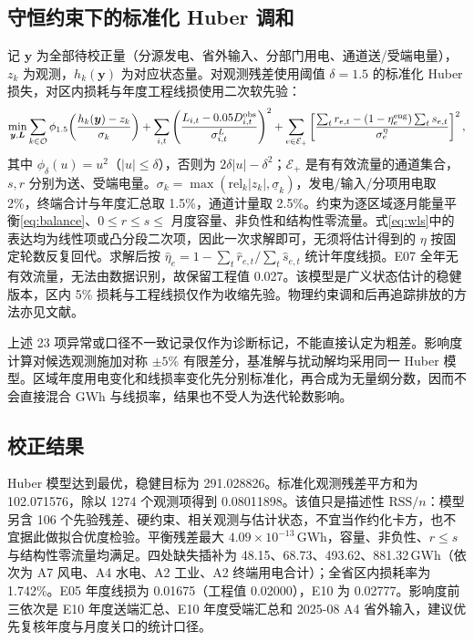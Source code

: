 \documentclass[UTF8,a4paper,zihao=-4,fontset=fandol]{ctexart}
\begin{document}
\subsection{守恒约束下的标准化 Huber 调和}

记 $\boldsymbol y$ 为全部待校正量（分源发电、省外输入、分部门用电、通道送/受端电量），$z_k$ 为观测，$h_k(\boldsymbol y)$ 为对应状态量。对观测残差使用阈值 $\delta=1.5$ 的标准化 Huber 损失，对区内损耗与年度工程线损使用二次软先验\cite{Crowe1996data,Narasimhan1999data}：
\begin{equation}
\min_{\boldsymbol y,\boldsymbol L}
\sum_{k\in\mathcal O}\phi_{1.5}\!\left(
\frac{h_k(\boldsymbol y)-z_k}{\sigma_k}\right)
+\sum_{i,t}\left(\frac{L_{i,t}-0.05D^{\rm obs}_{i,t}}
{\sigma^L_{i,t}}\right)^2
+\sum_{e\in\mathcal E_+}\left[
\frac{\sum_t r_{e,t}-(1-\eta_e^{\rm eng})\sum_t s_{e,t}}
{\sigma^{\eta}_e}\right]^2,
\label{eq:wls}
\end{equation}
其中 $\phi_\delta(u)=u^2$（$|u|\le\delta$），否则为 $2\delta|u|-\delta^2$；$\mathcal E_+$ 是有有效流量的通道集合，$s,r$ 分别为送、受端电量。$\sigma_k=\max(\mathrm{rel}_k|z_k|,\underline\sigma_k)$，发电/输入/分项用电取 2\%，终端合计与年度汇总取 1.5\%，通道计量取 2.5\%。约束为逐区域逐月能量平衡\eqref{eq:balance}、$0\le r\le s\le$ 月度容量、非负性和结构性零流量。式\eqref{eq:wls}中的表达均为线性项或凸分段二次项，因此一次求解即可，无须将估计得到的 $\eta$ 按固定轮数反复回代。求解后按 $\hat\eta_e=1-\sum_t\hat r_{e,t}/\sum_t\hat s_{e,t}$ 统计年度线损。E07 全年无有效流量，无法由数据识别，故保留工程值 0.027。该模型是广义状态估计的稳健版本\cite{Schweppe1970power,Abur2004power,Liu2023robust}，区内 5\% 损耗与工程线损仅作为收缩先验。物理约束调和后再追踪排放的方法亦见文献\cite{deChalendar2021physics}。

上述 23 项异常或口径不一致记录仅作为诊断标记，不能直接认定为粗差。影响度计算对候选观测施加对称 $\pm5\%$ 有限差分，基准解与扰动解均采用同一 Huber 模型。区域年度用电变化和线损率变化先分别标准化，再合成为无量纲分数，因而不会直接混合 GWh 与线损率，结果也不受人为迭代轮数影响。

\subsection{校正结果}

\begin{sloppypar}
Huber 模型达到最优，稳健目标为 291.028826。标准化观测残差平方和为 102.071576，除以 1274 个观测项得到 0.08011898。该值只是描述性 $\mathrm{RSS}/n$：模型另含 106 个先验残差、硬约束、相关观测与估计状态，不宜当作约化卡方，也不宜据此做拟合优度检验。平衡残差最大 $4.09\times10^{-13}$\,GWh，容量、非负性、$r\le s$ 与结构性零流量均满足。四处缺失插补为 48.15、68.73、493.62、881.32\,GWh（依次为 A7 风电、A4 水电、A2 工业、A2 终端用电合计）；全省区内损耗率为 1.742\%。E05 年度线损为 0.01675（工程值 0.02000），E10 为 0.02777。影响度前三依次是 E10 年度送端汇总、E10 年度受端汇总和 2025-08 A4 省外输入，建议优先复核年度与月度关口的统计口径。
\end{sloppypar}
\end{document}
